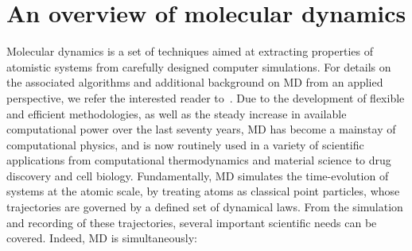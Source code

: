 \section{An overview of molecular dynamics}
\label{sec:01:MD}
Molecular dynamics is a set of techniques aimed at extracting properties of atomistic systems from carefully designed computer simulations. For details on the associated algorithms and additional background on MD from an applied perspective, we refer the interested reader to~\cite{AT17,FS01,T10}.
Due to the development of flexible and efficient methodologies, as well as the steady increase in available computational power over the last seventy years, MD has become a mainstay of computational physics, and is now routinely used in a variety of scientific applications from computational thermodynamics and material science to drug discovery and cell biology.
Fundamentally, MD simulates the time-evolution of systems at the atomic scale, by treating atoms as classical point particles, whose trajectories are governed by a defined set of dynamical laws. From the simulation and recording of these trajectories, several important scientific needs can be covered. Indeed, MD is simultaneously:
